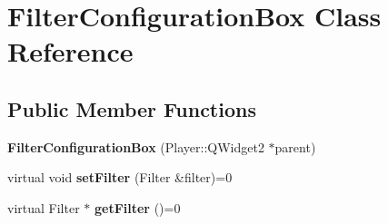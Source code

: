 \hypertarget{classFilterConfigurationBox}{}\section{Filter\+Configuration\+Box Class Reference}
\label{classFilterConfigurationBox}
\subsection*{Public Member Functions}
\begin{DoxyCompactItemize}
\item 
\hypertarget{classFilterConfigurationBox_ac3a044006bbdb4460dd4ebbfd7185b6e}{}{\bfseries Filter\+Configuration\+Box} (Player\+::\+Q\+Widget2 $\ast$parent)\label{classFilterConfigurationBox_ac3a044006bbdb4460dd4ebbfd7185b6e}

\item 
\hypertarget{classFilterConfigurationBox_a7a7beba5fa16a1b815ca6d436a20ba7b}{}virtual void {\bfseries set\+Filter} (Filter \&filter)=0\label{classFilterConfigurationBox_a7a7beba5fa16a1b815ca6d436a20ba7b}

\item 
\hypertarget{classFilterConfigurationBox_ab9e84d85b324d63c0d1674e2381e151a}{}virtual Filter $\ast$ {\bfseries get\+Filter} ()=0\label{classFilterConfigurationBox_ab9e84d85b324d63c0d1674e2381e151a}

\end{DoxyCompactItemize}
